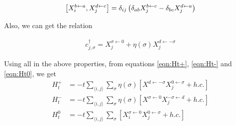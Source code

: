 \documentclass[]{report}
\begin{document}
\begin{align}
\comm{X^{b \leftarrow a}_{i}}{X^{d \leftarrow c}_{j}} = \delta_{ij} \left( \delta_{ab} X^{b \leftarrow c}_{j} - \delta_{bc} X^{d \leftarrow a}_{j} \right)
\end{align}

Also, we can get the relation

\begin{align}
c^{\dagger}_{j, \sigma} = X^{\sigma \leftarrow 0}_j + \eta(\sigma) X^{d \leftarrow -\sigma}_{j}
\end{align}

Using all in the above properties, from equations \eqref{eqn:Ht+}, \eqref{eqn:Ht-} and \eqref{eqn:Ht0}, we get
\begin{align}
H^{+}_{t} &= -t \sum_{\langle i, j \rangle} \sum_{\sigma} \eta(\sigma) \left[ X^{d \leftarrow -\sigma} X^{0 \leftarrow \sigma}_j + h.c. \right]\\
H^{-}_{t} &= -t \sum_{\langle i, j \rangle} \sum_{\sigma} \eta(\sigma) \left[ X^{\sigma \leftarrow 0} X^{-\sigma \leftarrow d}_j + h.c. \right]\\
H^{0}_{t} &= -t \sum_{\langle i, j \rangle} \sum_{\sigma} \left[ X^{\sigma \leftarrow 0}_{i} X^{0 \leftarrow \sigma}_{j} + h.c. \right]
\end{align}
\end{document}
